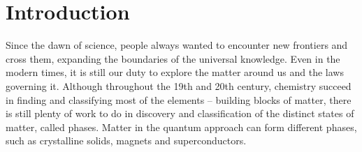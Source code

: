 \documentclass[titlepage,a4paper]{book}
\newcommand{\wciecie}{\quad\phantom{v}}
\begin{document}



\newpage
\large
\thispagestyle{empty}
\tableofcontents


\newpage

\chapter{Introduction}
\wciecie
Since the dawn of science, people always wanted to encounter new frontiers and cross them, expanding the boundaries of the universal knowledge. Even in the modern times, it is still our duty to explore the matter around us and the laws governing it. Although throughout the 19th  and 20th century, chemistry succeed in finding and classifying most of the elements -- building blocks of matter, there is still plenty of work to do in discovery and classification of the distinct states of matter, called phases. Matter in the quantum approach can form different phases, such as crystalline solids, magnets and superconductors. 
\end{document}
